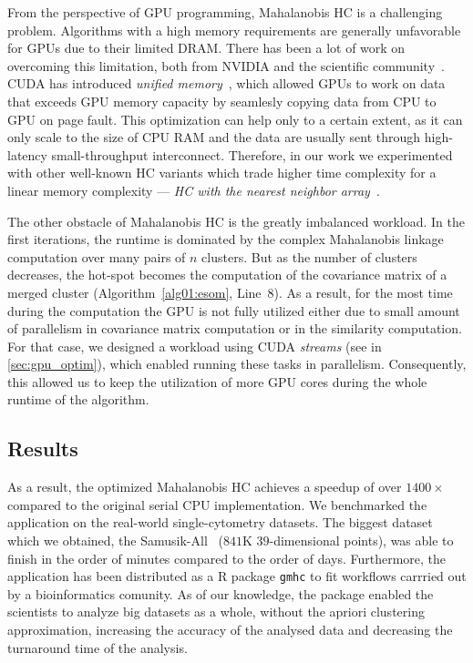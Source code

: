 From the perspective of GPU programming, Mahalanobis HC is a challenging problem. Algorithms with a high memory requirements are generally unfavorable for GPUs due to their limited DRAM. There has been a lot of work on overcoming this limitation, both from NVIDIA and the scientific community~\cite{zheng2016towards,kim2020batch,landaverde2014investigation}. CUDA has introduced \emph{unified memory}~\cite{site:cuda}, which allowed GPUs to work on data that exceeds GPU memory capacity by seamlesly copying data from CPU to GPU on page fault. This optimization can help only to a certain extent, as it can only scale to the size of CPU RAM and the data are usually sent through high-latency small-throughput interconnect. Therefore, in our work we experimented with other well-known HC variants which trade higher time complexity for a linear memory complexity --- \emph{HC with the nearest neighbor array}~\cite{day1984efficient}. 


The other obstacle of Mahalanobis HC is the greatly imbalanced workload. In the first iterations, the runtime is dominated by the complex Mahalanobis linkage computation over many pairs of $n$ clusters. But as the number of clusters decreases, the hot-spot becomes the computation of the covariance matrix of a merged cluster (Algorithm~\ref{alg01:esom}, Line~8). As a result, for the most time during the computation the GPU is not fully utilized either due to small amount of parallelism in covariance matrix computation or in the similarity computation. For that case, we designed a workload using CUDA \emph{streams} (see  in \cref{sec:gpu_optim}), which enabled running these tasks in parallelism. Consequently, this allowed us to keep the utilization of more GPU cores during the whole runtime of the algorithm.

\subsection{Results}

As a result, the optimized Mahalanobis HC achieves a speedup of over $1400\times$ compared to the original serial CPU implementation. We benchmarked the application on the real-world single-cytometry datasets. The biggest dataset which we obtained, the Samusik-All~\cite{flowrepo} ($841$K $39$-dimensional points), was able to finish in the order of minutes compared to the order of days. Furthermore, the application has been distributed as a R package \texttt{gmhc} to fit workflows carrried out by a bioinformatics comunity. As of our knowledge, the package enabled the scientists to analyze big datasets as a whole, without the apriori clustering approximation, increasing the accuracy of the analysed data and decreasing the turnaround time of the analysis.  

